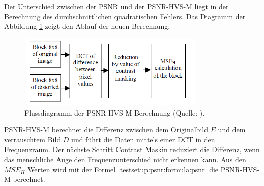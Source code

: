 Der Unterschied zwischen der PSNR und der PSNR-HVS-M liegt in der Berechnung des durchschnittlichen quadratischen Fehlers. Das Diagramm der Abbildung \ref{testsetup:ablauf:psnr:flowchart} zeigt den Ablauf der neuen Berechnung.

\begin{figure}[!htbp]
	\center
	\includegraphics[width=0.8\textwidth,height=3.5cm,keepaspectratio]{./pictures/testsetup/psnr-hvs-m-flow.png}
	\caption{Flussdiagramm der PSNR-HVS-M Berechnung (Quelle: \cite{ponomarenko2007between:psnr}).}
	\label{testsetup:ablauf:psnr:flowchart}
\end{figure}
PSNR-HVS-M berechnet die Differenz zwischen dem Originalbild $E$ und dem verrauschtem Bild $D$ und führt die Daten mittels einer DCT in den Frequenzraum. Der nächste Schritt Contrast Maskin reduziert die Differenz, wenn das menschliche Auge den Frequenzunterschied nicht erkennen kann. Aus den $MSE_H$ Werten wird mit der Formel \eqref{testsetup:psnr:formula:psnr} die PSNR-HVS-M berechnet.

